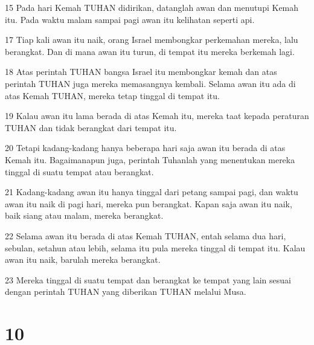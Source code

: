 \par 15 Pada hari Kemah TUHAN didirikan, datanglah awan dan menutupi Kemah itu. Pada waktu malam sampai pagi awan itu kelihatan seperti api.
\par 17 Tiap kali awan itu naik, orang Israel membongkar perkemahan mereka, lalu berangkat. Dan di mana awan itu turun, di tempat itu mereka berkemah lagi.
\par 18 Atas perintah TUHAN bangsa Israel itu membongkar kemah dan atas perintah TUHAN juga mereka memasangnya kembali. Selama awan itu ada di atas Kemah TUHAN, mereka tetap tinggal di tempat itu.
\par 19 Kalau awan itu lama berada di atas Kemah itu, mereka taat kepada peraturan TUHAN dan tidak berangkat dari tempat itu.
\par 20 Tetapi kadang-kadang hanya beberapa hari saja awan itu berada di atas Kemah itu. Bagaimanapun juga, perintah Tuhanlah yang menentukan mereka tinggal di suatu tempat atau berangkat.
\par 21 Kadang-kadang awan itu hanya tinggal dari petang sampai pagi, dan waktu awan itu naik di pagi hari, mereka pun berangkat. Kapan saja awan itu naik, baik siang atau malam, mereka berangkat.
\par 22 Selama awan itu berada di atas Kemah TUHAN, entah selama dua hari, sebulan, setahun atau lebih, selama itu pula mereka tinggal di tempat itu. Kalau awan itu naik, barulah mereka berangkat.
\par 23 Mereka tinggal di suatu tempat dan berangkat ke tempat yang lain sesuai dengan perintah TUHAN yang diberikan TUHAN melalui Musa.

\chapter{10}

